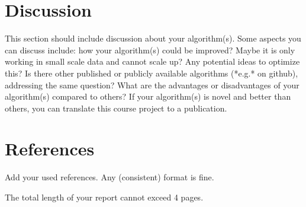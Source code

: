 \documentclass{IEEEtran}
\begin{document}
\section{Discussion}

This section should include discussion about your algorithm(s). Some aspects you can discuss include: how your algorithm(s) could be improved? Maybe it is only working in small scale data and cannot scale up? Any potential ideas to optimize this? Is there other published or publicly available algorithms (*e.g.* on github), addressing the same question? What are the advantages or disadvantages of your algorithm(s) compared to others? If your algorithm(s) is novel and better than others, you can translate this course project to a publication.

\section{References}

Add your used references. Any (consistent) format is fine.

The total length of your report cannot exceed 4 pages.
\end{document}
